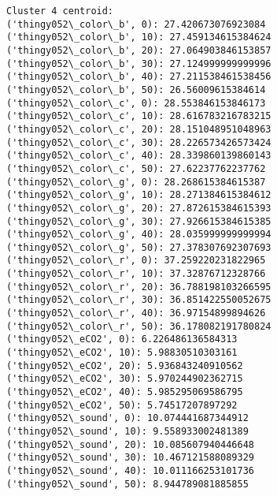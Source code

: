 \documentclass[11pt]{article}
\begin{document}
\begin{Verbatim}[commandchars=\\\{\}]
Cluster 4 centroid:
('thingy052\_color\_b', 0): 27.420673076923084
('thingy052\_color\_b', 10): 27.459134615384624
('thingy052\_color\_b', 20): 27.064903846153857
('thingy052\_color\_b', 30): 27.124999999999996
('thingy052\_color\_b', 40): 27.211538461538456
('thingy052\_color\_b', 50): 26.56009615384614
('thingy052\_color\_c', 0): 28.553846153846173
('thingy052\_color\_c', 10): 28.616783216783215
('thingy052\_color\_c', 20): 28.151048951048963
('thingy052\_color\_c', 30): 28.226573426573424
('thingy052\_color\_c', 40): 28.339860139860143
('thingy052\_color\_c', 50): 27.62237762237762
('thingy052\_color\_g', 0): 28.268615384615387
('thingy052\_color\_g', 10): 28.271384615384612
('thingy052\_color\_g', 20): 27.872615384615393
('thingy052\_color\_g', 30): 27.926615384615385
('thingy052\_color\_g', 40): 28.035999999999994
('thingy052\_color\_g', 50): 27.378307692307693
('thingy052\_color\_r', 0): 37.259220231822965
('thingy052\_color\_r', 10): 37.32876712328766
('thingy052\_color\_r', 20): 36.788198103266595
('thingy052\_color\_r', 30): 36.851422550052675
('thingy052\_color\_r', 40): 36.97154899894626
('thingy052\_color\_r', 50): 36.178082191780824
('thingy052\_eCO2', 0): 6.226486136584313
('thingy052\_eCO2', 10): 5.98830510303161
('thingy052\_eCO2', 20): 5.936843240910562
('thingy052\_eCO2', 30): 5.970244902362715
('thingy052\_eCO2', 40): 5.985295069586795
('thingy052\_eCO2', 50): 5.74517207897292
('thingy052\_sound', 0): 10.074441687344912
('thingy052\_sound', 10): 9.558933002481389
('thingy052\_sound', 20): 10.085607940446648
('thingy052\_sound', 30): 10.467121588089329
('thingy052\_sound', 40): 10.011166253101736
('thingy052\_sound', 50): 8.944789081885855


\end{Verbatim}
\end{document}
